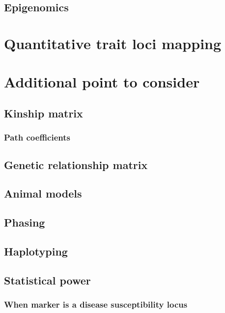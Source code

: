 \documentclass[]{book}
\theoremstyle{definition}
\theoremstyle{definition}
\theoremstyle{definition}
\theoremstyle{remark}
\begin{document}
\section{Epigenomics}\label{epigenomics}

\chapter{Quantitative trait loci
mapping}\label{quantitative-trait-loci-mapping}

\chapter{Additional point to
consider}\label{additional-point-to-consider}

\section{Kinship matrix}\label{kinship-matrix}

\subsection{Path coefficients}\label{path-coefficients}

\section{Genetic relationship matrix}\label{genetic-relationship-matrix}

\section{Animal models}\label{animal-models}

\section{Phasing}\label{phasing}

\section{Haplotyping}\label{haplotyping}

\section{Statistical power}\label{statistical-power}

\subsection{When marker is a disease susceptibility
locus}\label{when-marker-is-a-disease-susceptibility-locus}
\end{document}
